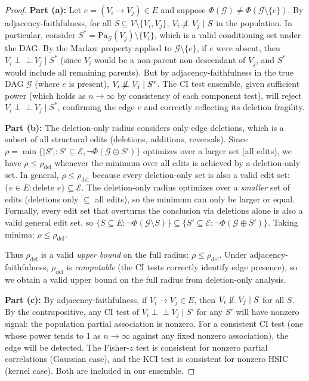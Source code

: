 \documentclass[11pt,a4paper]{article}
\theoremstyle{definition}
\theoremstyle{remark}
\newcommand{\CI}{\perp\!\!\!\perp}
\newcommand{\NCI}{\not\!\perp\!\!\!\perp}
\newcommand{\DAG}{\mathcal{G}}
\newcommand{\Pa}{\mathrm{Pa}}
\newcommand{\radius}{\rho}
\newcommand{\Phi}{\varPhi}
\begin{document}
\begin{proof}
\textbf{Part (a):} Let $e = (V_i \to V_j) \in E$ and suppose
$\Phi(\DAG) \neq \Phi(\DAG \setminus \{e\})$. By adjacency-faithfulness,
for all $S \subseteq V \setminus \{V_i, V_j\}$, $V_i \NCI V_j \mid S$ in
the population. In particular, consider $S^* = \Pa_\DAG(V_j) \setminus
\{V_i\}$, which is a valid conditioning set under the DAG. By the Markov
property applied to $\DAG \setminus \{e\}$, if $e$ were absent, then
$V_i \CI V_j \mid S^*$ (since $V_i$ would be a non-parent non-descendant
of $V_j$, and $S^*$ would include all remaining parents). But by
adjacency-faithfulness in the true DAG $\DAG$ (where $e$ is present),
$V_i \NCI V_j \mid S^*$. The CI test ensemble, given sufficient power
(which holds as $n \to \infty$ by consistency of each component test),
will reject $V_i \CI V_j \mid S^*$, confirming the edge $e$ and
correctly reflecting its deletion fragility.

\textbf{Part (b):} The deletion-only radius considers only edge
deletions, which is a subset of all structural edits (deletions, additions,
reversals). Since $\radius = \min\{|S'| : S' \subseteq \mathcal{E},
\neg\Phi(\DAG \oplus S')\}$ optimizes over a larger set (all edits), we
have $\radius \leq \radius_{\mathrm{del}}$ whenever the minimum over all
edits is achieved by a deletion-only set. In general,
$\radius \leq \radius_{\mathrm{del}}$ because every deletion-only set is
also a valid edit set: $\{e \in E : \text{delete } e\} \subseteq \mathcal{E}$.
The deletion-only radius optimizes over a \emph{smaller} set of edits
(deletions only $\subseteq$ all edits), so the minimum can only be larger
or equal. Formally, every edit set that overturns the conclusion via
deletions alone is also a valid general edit set, so
$\{S \subseteq E : \neg\Phi(\DAG \setminus S)\} \subseteq
\{S' \subseteq \mathcal{E} : \neg\Phi(\DAG \oplus S')\}$.
Taking minima: $\radius \leq \radius_{\mathrm{del}}$.

Thus $\radius_{\mathrm{del}}$ is a valid \emph{upper bound} on the full
radius: $\radius \leq \radius_{\mathrm{del}}$. Under adjacency-faithfulness,
$\radius_{\mathrm{del}}$ is \emph{computable} (the CI tests correctly
identify edge presence), so we obtain a valid upper bound on the full
radius from deletion-only analysis.

\textbf{Part (c):} By adjacency-faithfulness, if $V_i \to V_j \in E$,
then $V_i \NCI V_j \mid S$ for all $S$. By the contrapositive, any CI test
of $V_i \CI V_j \mid S'$ for any $S'$ will have nonzero signal: the
population partial association is nonzero. For a consistent CI test (one
whose power tends to 1 as $n \to \infty$ against any fixed nonzero
association), the edge will be detected. The Fisher-$z$ test is
consistent for nonzero partial correlations (Gaussian case), and the
KCI test is consistent for nonzero HSIC (kernel case). Both are included
in our ensemble.
\end{proof}
\end{document}
